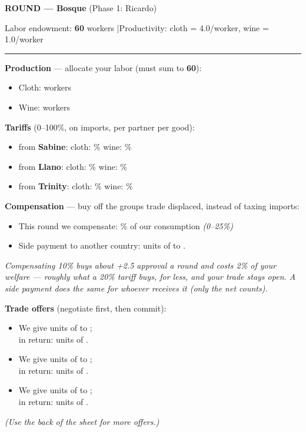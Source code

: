 \documentclass[11pt]{article}
\newcommand{\blank}[1]{\underline{\hspace{#1}}}
\newcommand{\hr}{\par\vspace{2pt}\noindent\rule{\linewidth}{0.4pt}\par\vspace{2pt}}
\begin{document}
\newpage

{\large\bfseries ROUND \blank{1cm} --- Bosque} \hfill (Phase 1: Ricardo)\par
Labor endowment: \textbf{60} workers \quad|\quad Productivity: cloth = 4.0/worker, wine = 1.0/worker
\hr

{\bfseries Production} --- allocate your labor (must sum to \textbf{60}):\par
\begin{itemize}[nosep,leftmargin=1.4em]
  \item Cloth: \blank{2.5cm} workers
  \item Wine: \blank{2.5cm} workers
\end{itemize}

\vspace{4pt}
{\bfseries Tariffs} (0--100\%, on imports, per partner per good):\par
\begin{itemize}[nosep,leftmargin=1.4em]
  \item from \textbf{Sabine}: \quad cloth: \blank{1.4cm}\% \quad wine: \blank{1.4cm}\%
  \item from \textbf{Llano}: \quad cloth: \blank{1.4cm}\% \quad wine: \blank{1.4cm}\%
  \item from \textbf{Trinity}: \quad cloth: \blank{1.4cm}\% \quad wine: \blank{1.4cm}\%
\end{itemize}

\vspace{4pt}
{\bfseries Compensation} --- buy off the groups trade displaced, instead of taxing imports:\par
\begin{itemize}[nosep,leftmargin=1.4em]
  \item This round we compensate: \blank{1.4cm}\% of our consumption \quad \textit{(0--25\%)}
  \item Side payment to another country: \blank{1.6cm} units of \blank{2cm} to \blank{2.2cm}.
\end{itemize}
\textit{Compensating 10\% buys about +2.5 approval a round and costs 2\% of your welfare --- roughly what a 20\% tariff buys, for less, and your trade stays open. A side payment does the same for whoever receives it (only the net counts).}

\vspace{4pt}
{\bfseries Trade offers} (negotiate first, then commit):\par
\begin{itemize}[itemsep=4pt,leftmargin=1.4em]
  \item We give \blank{1.8cm} units of \blank{2.2cm} to \blank{2.2cm};\\[2pt] in return: \blank{1.8cm} units of \blank{2.2cm}.
  \item We give \blank{1.8cm} units of \blank{2.2cm} to \blank{2.2cm};\\[2pt] in return: \blank{1.8cm} units of \blank{2.2cm}.
  \item We give \blank{1.8cm} units of \blank{2.2cm} to \blank{2.2cm};\\[2pt] in return: \blank{1.8cm} units of \blank{2.2cm}.
\end{itemize}
\textit{(Use the back of the sheet for more offers.)}
\end{document}
